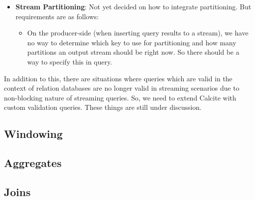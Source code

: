 \documentclass[10pt, conference, compsocconf]{IEEEtran}
\begin{document}
\begin{itemize}
\item \textbf{Stream Partitioning}: Not yet decided on how to integrate partitioning. But requirements are as follows:
\begin{itemize}
\item On the producer-side (when inserting query results to a stream), we have no way to determine which key to use for partitioning and how many partitions an output stream should be right now. So there should be a way to specify this in query.
\end{itemize}

\end{itemize}

In addition to this, there are situations where queries which are valid in the context of relation databases are no longer valid in streaming scenarios due to non-blocking nature of streaming queries. So, we need to extend Calcite with custom validation queries. These things are still under discussion.

\subsection{Windowing}
\subsection{Aggregates}
\subsection{Joins}







\end{document}
